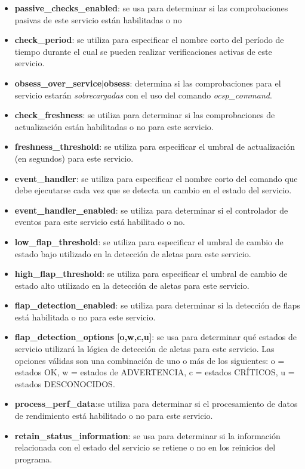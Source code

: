 \begin{itemize}
	\item \textbf{passive\_checks\_enabled}: se usa para determinar si las comprobaciones pasivas de este servicio están habilitadas o no	
	\item \textbf{check\_period}: se utiliza para especificar el nombre corto del período de tiempo durante el cual se pueden realizar verificaciones activas de este servicio.	
	\item \textbf{obsess\_over\_service$|$obsess}: determina si las comprobaciones para el servicio estarán \textit{sobrecargadas} con el uso del comando \textit{ocsp\_command}.
	\item \textbf{check\_freshness}: se utiliza para determinar si las comprobaciones de actualización están habilitadas o no para este servicio. 	
	\item \textbf{freshness\_threshold}: se utiliza para especificar el umbral de actualización (en segundos) para este servicio. 	
	\item \textbf{event\_handler}: se utiliza para especificar el nombre corto del comando que debe ejecutarse cada vez que se detecta un cambio en el estado del servicio. 	
	\item \textbf{event\_handler\_enabled}: se utiliza para determinar si el controlador de eventos para este servicio está habilitado o no.
	\item \textbf{low\_flap\_threshold}: se utiliza para especificar el umbral de cambio de estado bajo utilizado en la detección de aletas para este servicio.  	
	\item \textbf{high\_flap\_threshold}: se utiliza para especificar el umbral de cambio de estado alto utilizado en la detección de aletas para este servicio. 	
	\item \textbf{flap\_detection\_enabled}: se utiliza para determinar si la detección de flaps está habilitada o no para este servicio.	
	\item \textbf{flap\_detection\_options	[o,w,c,u]}: se usa para determinar qué estados de servicio utilizará la lógica de detección de aletas para este servicio. Las opciones válidas son una combinación de uno o más de los siguientes: o = estados OK, w = estados de ADVERTENCIA, c = estados CRÍTICOS, u = estados DESCONOCIDOS.
	\item \textbf{process\_perf\_data}:se utiliza para determinar si el procesamiento de datos de rendimiento está habilitado o no para este servicio. 	
	\item \textbf{retain\_status\_information}: se usa para determinar si la información relacionada con el estado del servicio se retiene o no en los reinicios del programa.

\end{itemize}

